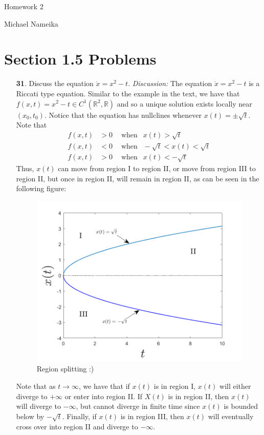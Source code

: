 \documentclass{article}
\begin{document}
\begin{center}
    {\Large Homework 2}
    \vspace{0.5 cm}

    {\large Michael Nameika}
\end{center}

\section*{Section 1.5 Problems}
\begin{itemize}
    \item[\textbf{31}.] Discuss the equation $\dot{x} = x^2 - t$.
    \newline\newline
    \textit{Discussion:} The equation $\dot{x} = x^2 - t$ is a Riccati type equation. Similar to the example in the text, we have that $f(x,t) = x^2 - t \in C^1(\mathbb{R}^2, \mathbb{R})$ and so a unique solution exists locally near $(x_0, t_0)$. Notice that the equation has nullclines whenever $x(t) = \pm \sqrt{t}$. Note that
    \begin{align*}
        f(x,t) &> 0 \:\:\:\: \text{ when  }\:\: x(t) > \sqrt{t}\\
        f(x,t) &< 0 \:\:\:\: \text{ when  }\:\: -\sqrt{t} < x(t) < \sqrt{t}\\
        f(x,t) &> 0 \:\:\:\: \text{ when  }\:\: x(t) < -\sqrt{t}
    \end{align*}
    Thus, $x(t)$ can move from region I to region II, or move from region III to region II, but once in region II, will remain in region II, as can be seen in the following figure:
    \begin{figure}[H]
        \centering
        \includegraphics[scale = 0.4]{discussionPlot.png}
        \caption{Region splitting :)}
    \end{figure}
    Note that as $t \to \infty$, we have that if $x(t)$ is in region I, $x(t)$ will either diverge to $+\infty$ or enter into region II. If $X(t)$ is in region II, then $x(t)$ will diverge to $-\infty$, but cannot diverge in finite time since $x(t)$ is bounded below by $-\sqrt{t}$. Finally, if $x(t)$ is in region III, then $x(t)$ will eventually cross over into region II and diverge to $-\infty$.
    

\end{itemize}
\end{document}
